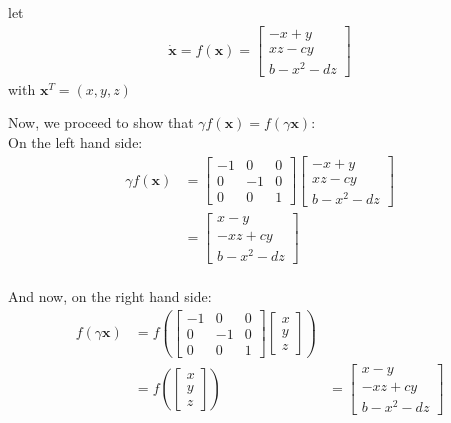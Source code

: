 \begin{itemize}
\begin{itemize}
let \\  \begin{align}
\mathbf{\dot{x}}=f(\mathbf{x}) =
\begin{bmatrix}
-x + y \\
xz-cy\\
b-x^2-dz
\end{bmatrix}
\end{align}
with $\mathbf{x}^T=(x,y,z)$

Now, we proceed to show that $\gamma f(\mathbf{x})=f(\gamma \mathbf{x})$:\\
On the left hand side:
  \begin{align*}
\gamma f(\mathbf{x})&=
\begin{bmatrix}
-1 & 0 &0 \\
0 & -1 & 0\\
0 & 0 & 1
\end{bmatrix} \begin{bmatrix}
-x+y \\
xz-cy\\
b-x^2-dz
\end{bmatrix}\\
&=\begin{bmatrix}
x-y \\
-xz+cy\\
b-x^2-dz
\end{bmatrix}\\
\end{align*}

And now, on the right hand side:\\
  \begin{align*}
   f(\gamma \mathbf{x})&= f\left (\begin{bmatrix}
-1 & 0 &0 \\
0 & -1 & 0\\
0 & 0 & 1
\end{bmatrix} \begin{bmatrix}
x \\
y\\
z
\end{bmatrix} \right)\\
&=f\left ( \begin{bmatrix}
x \\
y\\
z
\end{bmatrix}\right )
&=\begin{bmatrix}
x-y \\
-xz+cy\\
b-x^2-dz
\end{bmatrix}
  \end{align*}


\end{itemize}
\end{itemize}
